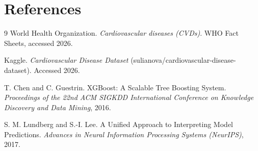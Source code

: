 \documentclass[12pt, a4paper, oneside]{book}
\begin{document}
\chapter*{References}
\begin{thebibliography}{9}
World Health Organization.
\textit{Cardiovascular diseases (CVDs)}.
WHO Fact Sheets, accessed 2026.

Kaggle.
\textit{Cardiovascular Disease Dataset} (sulianova/cardiovascular-disease-dataset).
Accessed 2026.

T. Chen and C. Guestrin.
XGBoost: A Scalable Tree Boosting System.
\textit{Proceedings of the 22nd ACM SIGKDD International Conference on Knowledge Discovery and Data Mining}, 2016.

S. M. Lundberg and S.-I. Lee.
A Unified Approach to Interpreting Model Predictions.
\textit{Advances in Neural Information Processing Systems (NeurIPS)}, 2017.
\end{thebibliography}

\appendix

\end{document}
